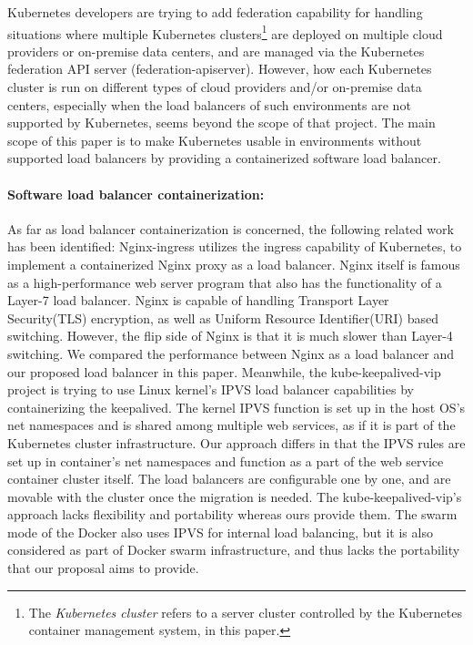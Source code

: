 Kubernetes developers are trying to add federation\cite{K8sFederation2017} capability for handling situations 
where multiple Kubernetes clusters\footnote{The {\em Kubernetes cluster} refers to a server cluster 
controlled by the Kubernetes container management system, in this paper.} 
are deployed on multiple cloud providers or on-premise data centers, 
and are managed via the Kubernetes federation API server (federation-apiserver). 
However, how each Kubernetes cluster is run on different types of cloud providers
and/or on-premise data centers, especially when the load balancers of such environments are not supported by Kubernetes, 
seems beyond the scope of that project. 
The main scope of this paper is to make Kubernetes usable in environments 
without supported load balancers by providing a containerized software load balancer.

\paragraph{\bf Software load balancer containerization:}
As far as load balancer containerization is concerned, the following related work has been identified:
Nginx-ingress\cite{Pleshakov2016,NginxInc2016} utilizes the ingress\cite{K8sIngress2017} capability of Kubernetes, 
to implement a containerized Nginx proxy as a load balancer. Nginx itself is famous as a high-performance web server program
that also has the functionality of a Layer-7 load balancer. Nginx is capable of handling Transport Layer Security(TLS) encryption, 
as well as Uniform Resource Identifier(URI) based switching. However, the flip side of Nginx is that it is much slower than Layer-4 switching.
We compared the performance between Nginx as a load balancer and our proposed load balancer in this paper.
%
Meanwhile, the kube-keepalived-vip\cite{Prashanth2016} project is trying to use Linux kernel's IPVS\cite{Zhang2000} 
load balancer capabilities by containerizing the keepalived\cite{ACassen2016}.
The kernel IPVS function is set up in the host OS's net namespaces and is shared among multiple web services,
as if it is part of the Kubernetes cluster infrastructure.
Our approach differs in that the IPVS rules are set up in container's net namespaces 
and function as a part of the web service container cluster itself.
The load balancers are configurable one by one, and are  movable with the cluster once the migration is needed.
The kube-keepalived-vip's approach lacks flexibility and portability whereas ours provide them.
%
The swarm mode of the Docker\cite{DockerCoreEngineering2016,DockerInc2017} also uses IPVS for internal load balancing,
but it is also considered as part of Docker swarm infrastructure, 
and thus lacks the portability that our proposal aims to provide.


